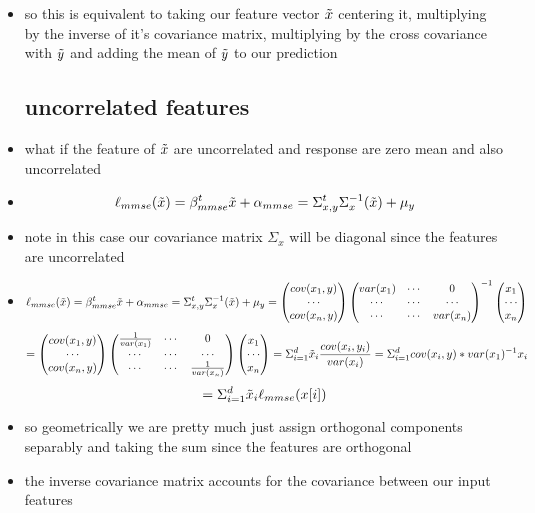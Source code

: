 \documentclass{article}
\begin{document}
\begin{itemize}
\item so this is equivalent to taking our feature vector $\Tilde{x}$ centering it, multiplying by the inverse of it's
covariance matrix, multiplying by the cross covariance with $\Tilde{y}$ and adding the mean of $\Tilde{y}$ to our prediction


\subsection*{uncorrelated features}
\item what if the feature of $\Tilde{x}$ are uncorrelated and response are zero mean and also uncorrelated
\item $$\ell_{mmse}(\Tilde{x})=\beta_{mmse}^{t}\Tilde{x}+\alpha_{mmse}=\Sigma_{x,y}^{t}\Sigma_{x}^{-1}(\Tilde{x})+\mu_{y}
$$
\item note in this case our covariance matrix  $\Sigma_{x}$ will be diagonal since the features are uncorrelated
\item $$\ell_{mmse}(\Tilde{x})=\beta_{mmse}^{t}\Tilde{x}+\alpha_{mmse}=\Sigma_{x,y}^{t}\Sigma_{x}^{-1}(\Tilde{x})+\mu_{y}
=\begin{pmatrix}
    cov(x_1, y)\\ \cdots \\ cov(x_n, y)
\end{pmatrix}  \begin{pmatrix}
    var(x_1) &\cdots &0\\ \cdots &\cdots &\cdots\\ \cdots & \cdots & var(x_n)
\end{pmatrix}^{-1} \begin{pmatrix} x_1 \\ \cdots \\x_n \end{pmatrix} $$ $$=\begin{pmatrix}
    cov(x_1, y)\\ \cdots \\ cov(x_n, y)
\end{pmatrix}  \begin{pmatrix}
    \frac{1}{var(x_1)} &\cdots &0\\ \cdots &\cdots &\cdots\\ \cdots & \cdots & \frac{1}{var(x_n)}
\end{pmatrix}\begin{pmatrix} x_1 \\ \cdots \\x_n \end{pmatrix}= \Sigma_{i=1}^{d}\Tilde{x}_{i}\frac{cov(x_i, y_i)}{var(x_i)}=
\Sigma_{i=1}^{d}cov(x_i,y)*var(x_1)^{-1}x_i$$ $$=\Sigma_{i=1}^{d}\Tilde{x}_{i}\ell_{mmse}(x[i])$$
 \item so geometrically we are pretty much just assign orthogonal components separably and taking the sum since the features are orthogonal
 \item the inverse covariance matrix accounts for the covariance between our input features

\end{itemize}
\end{document}
